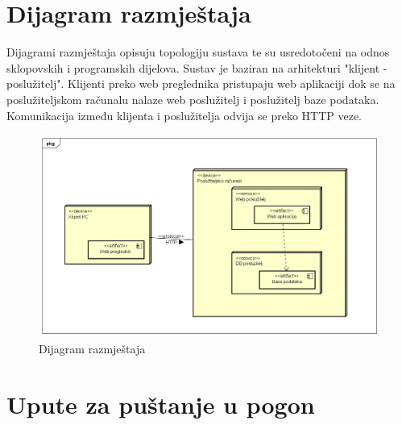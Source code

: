 		
		\section{Dijagram razmještaja}
			
			
			
			Dijagrami razmještaja opisuju topologiju sustava te su usredotočeni na odnos sklopovskih i programskih dijelova. Sustav je baziran na arhitekturi "klijent - poslužitelj". Klijenti preko web preglednika pristupaju web aplikaciji dok se na poslužiteljskom računalu nalaze web poslužitelj i poslužitelj baze podataka. Komunikacija između klijenta i poslužitelja odvija se preko HTTP veze.

			\begin{figure} [H]
			    \centering
			    \includegraphics[width=1.0\linewidth]{slike/Deployment_Diagram.png}
                \caption{Dijagram razmještaja}
                \label{fig:Dijagram razmještaja}
		    \end{figure}
			\eject
		
		\section{Upute za puštanje u pogon}
		
		
			
